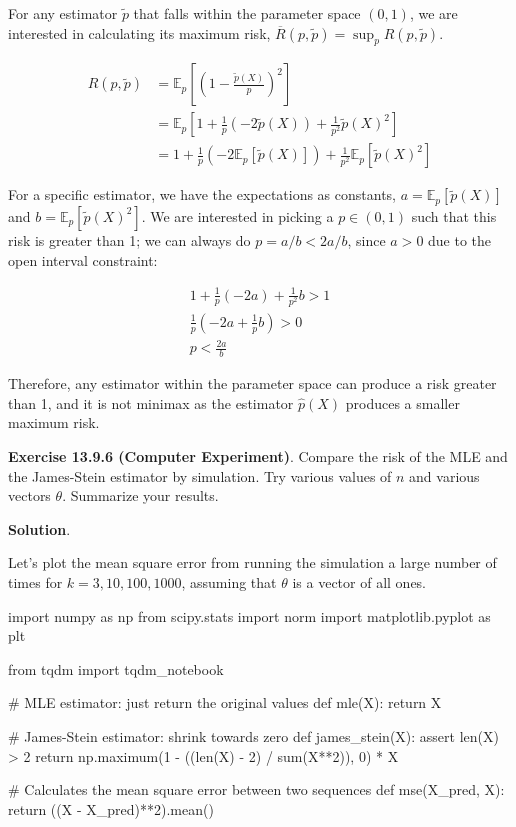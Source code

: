 For any estimator \(\tilde{p}\) that falls within the parameter space
\((0, 1)\), we are interested in calculating its maximum risk,
\(\overline{R}(p, \tilde{p}) = \sup_p R(p, \tilde{p})\).

\begin{align}
R(p, \tilde{p}) &= \mathbb{E}_p \left[\left(1 - \frac{\tilde{p}(X)}{p} \right)^2\right]\\
&=\mathbb{E}_p \left[1 + \frac{1}{p} (-2 \tilde{p}(X)) + \frac{1}{p^2} \tilde{p}(X)^2 \right] \\
&= 1 + \frac{1}{p} (-2 \mathbb{E}_p[\tilde{p}(X)]) + \frac{1}{p^2} \mathbb{E}_p[\tilde{p}(X)^2]
\end{align}

For a specific estimator, we have the expectations as constants,
\(a = \mathbb{E}_p[\tilde{p}(X)]\) and
\(b = \mathbb{E}_p[\tilde{p}(X)^2]\). We are interested in picking a
\(p \in (0, 1)\) such that this risk is greater than 1; we can always do
\(p = a / b < 2a / b\), since \(a > 0\) due to the open interval
constraint:

\begin{align}
1 + \frac{1}{p} (-2a) + \frac{1}{p^2} b > 1 \\
\frac{1}{p} \left(-2a + \frac{1}{p} b \right) > 0 \\
p < \frac{2a}{b}
\end{align}

Therefore, any estimator within the parameter space can produce a risk
greater than 1, and it is not minimax as the estimator \(\hat{p}(X)\)
produces a smaller maximum risk.

\textbf{Exercise 13.9.6 (Computer Experiment)}. Compare the risk of the
MLE and the James-Stein estimator by simulation. Try various values of
\(n\) and various vectors \(\theta\). Summarize your results.

\textbf{Solution}.

Let's plot the mean square error from running the simulation a large
number of times for \(k = 3, 10, 100, 1000\), assuming that \(\theta\)
is a vector of all ones.

\begin{python}
import numpy as np
from scipy.stats import norm
import matplotlib.pyplot as plt

from tqdm import tqdm_notebook


# MLE estimator: just return the original values
def mle(X):
    return X

# James-Stein estimator: shrink towards zero
def james_stein(X):
    assert len(X) > 2
    return np.maximum(1 - ((len(X) - 2) / sum(X**2)), 0) * X

# Calculates the mean square error between two sequences
def mse(X_pred, X):
    return ((X - X_pred)**2).mean()
\end{python}

